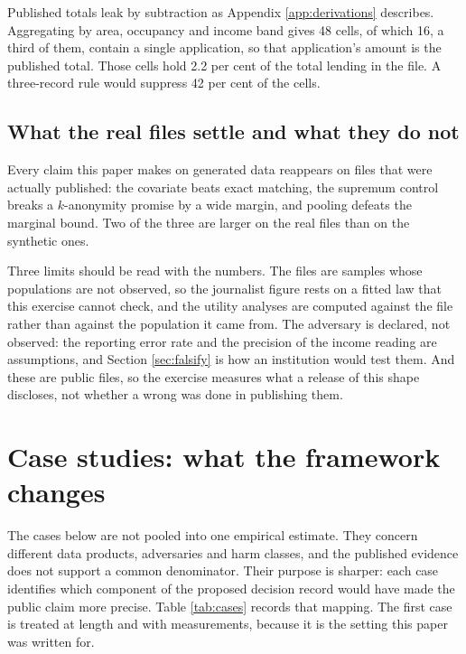 \documentclass[11pt,a4paper]{article}
\theoremstyle{plain}
\theoremstyle{definition}
\begin{document}
Published totals leak by subtraction as Appendix \ref{app:derivations} describes.
Aggregating by area, occupancy and income band gives 48 cells, of which 16, a
third of them, contain a single application, so that application's amount is the
published total. Those cells hold 2.2 per cent of the total lending in the file.
A three-record rule would suppress 42 per cent of the cells.

\subsection{What the real files settle and what they do not}

Every claim this paper makes on generated data reappears on files that were
actually published: the covariate beats exact matching, the supremum control
breaks a $k$-anonymity promise by a wide margin, and pooling defeats the marginal
bound. Two of the three are larger on the real files than on the synthetic ones.

Three limits should be read with the numbers. The files are samples whose
populations are not observed, so the journalist figure rests on a fitted law that
this exercise cannot check, and the utility analyses are computed against the file
rather than against the population it came from. The adversary is declared, not
observed: the reporting error rate and the precision of the income reading are
assumptions, and Section \ref{sec:falsify} is how an institution would test them.
And these are public files, so the exercise measures what a release of this shape
discloses, not whether a wrong was done in publishing them.

\section{Case studies: what the framework changes}\label{sec:cases}

The cases below are not pooled into one empirical estimate. They concern
different data products, adversaries and harm classes, and the published evidence
does not support a common denominator. Their purpose is sharper: each case
identifies which component of the proposed decision record would have made the
public claim more precise. Table \ref{tab:cases} records that mapping. The first
case is treated at length and with measurements, because it is the setting this
paper was written for.
\end{document}
